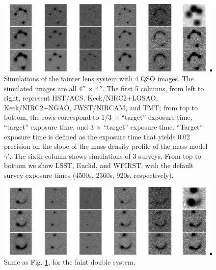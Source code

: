 \documentclass[a4paper,11pt]{article}
\begin{document}
\begin{figure}
\begin{center}
\includegraphics[width=1.0\textwidth]{figures/fainter_system_4QSOimages_all.png}
\end{center}
\caption{Simulations of the fainter lens system with 4 QSO images. The simulated images are all 4$''$ $\times$ 4$''$. The first 5 columns, from left to right, represent HST/ACS, Keck/NIRC2+LGSAO, Keck/NIRC2+NGAO, JWST/NIRCAM, and TMT; from top to bottom, the rows correspond to 1/3 $\times$ ``target'' exposure time, ``target'' exposure time, and 3 $\times$ ``target'' exposure time. ``Target'' exposure time is defined as the exposure time that yields 0.02 precision on the slope of the mass density profile of the mass model $\gamma'$. The sixth column shows simulations of 3 surveys. From top to bottom we show LSST, Euclid, and WFIRST, with the default survey exposure times (4500s, 2360s, 920s, respectively).}
\label{fig:fainter_4QSOimages_montage}
\end{figure}


\begin{figure}
\begin{center}
\includegraphics[width=1.0\textwidth]{figures/fainter_system_2QSOimages_all.png}
\end{center}
\caption{Same as Fig. \ref{fig:fainter_4QSOimages_montage}, for the faint double system.}
\label{fig:fainter_2QSOimages_montage}
\end{figure}
\end{document}
